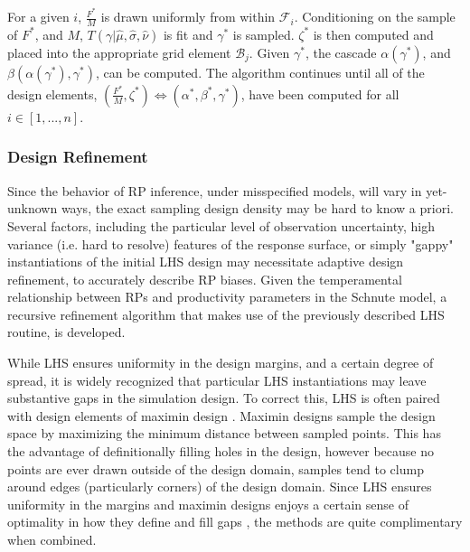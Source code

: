 %
For a given $i$, $\frac{F^*}{M}$ is drawn uniformly from within $\mathcal{F}_i$. Conditioning on the
sample of $F^*$, and $M$, $T(\gamma|\hat\mu, \hat\sigma, \hat\nu)$ is fit and
$\gamma^*$ is sampled. $\zeta^*$ is then computed and placed into the appropriate
grid element $\mathcal{B}_j$. Given $\gamma^*$, the cascade $\alpha(\gamma^*)$,
and $\beta(\alpha(\gamma^*), \gamma^*)$, can be computed. The algorithm
continues until all of the design elements, $(\frac{F^*}{M}, \zeta^*)\Leftrightarrow(\alpha^*, \beta^*, \gamma^*)$,
have been computed for all $i\in[1,...,n]$.

%
\subsubsection{Design Refinement\label{desRef}}

%
Since the behavior of RP inference, under misspecified models, will vary in
yet-unknown ways, the exact sampling design density may be hard to know a priori.
Several factors, including the particular level of observation uncertainty,
high variance (i.e. hard to resolve) features of the response surface, or
simply "gappy" instantiations of the initial LHS design may necessitate
adaptive design refinement, to accurately describe RP biases. Given the
temperamental relationship between RPs and productivity parameters in the
Schnute model, a recursive refinement algorithm that makes use of the
previously described LHS routine, is developed.

%
While LHS ensures uniformity in the design margins, and a certain degree of spread,
it is widely recognized that particular LHS instantiations may leave substantive gaps
in the simulation design. To correct this, LHS is often paired with design elements
of maximin design \cite{morris_exploratory_1995,devon_lin_latin_2015}. Maximin designs sample
the design space by maximizing the minimum distance between sampled points.
This has the advantage of definitionally filling holes in the design, %
however because no points are ever drawn outside of the design domain, samples tend to
clump around edges (particularly corners) of the design domain. Since LHS ensures
uniformity in the margins and maximin designs enjoys a certain sense of optimality 
in how they define and fill gaps \cite{johnson_minimax_1990}, the methods are 
quite complimentary when combined.

